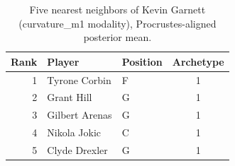 \begin{table}[htbp]
  \centering\small
  \begin{tabular}{rllc}
    \toprule
    Rank & Player & Position & Archetype \\
    \midrule
    1 & Tyrone Corbin & F & 1 \\
    2 & Grant Hill & G & 1 \\
    3 & Gilbert Arenas & G & 1 \\
    4 & Nikola Jokic & C & 1 \\
    5 & Clyde Drexler & G & 1 \\
    \bottomrule
  \end{tabular}
  \caption{Five nearest neighbors of Kevin Garnett (curvature_m1 modality), Procrustes-aligned posterior mean.}
  \label{tab:Kevin_Garnett_neighbors_curvature_m1}
\end{table}

